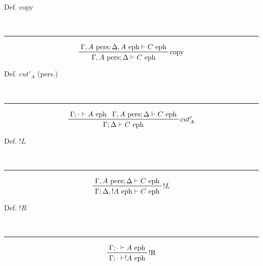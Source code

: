 \begin{note}
  \begin{field}
    Def. copy
  \end{field} \\
  \noindent\rule[0.5ex]{\linewidth}{1pt}
  \begin{field}
    \[ 
      \prftree[r]
      {copy}
      {\Gamma,A\text{ pers};\Delta,A\text{ eph}\vdash C\text{ eph}}
      {\Gamma,A\text{ pers};\Delta\vdash C\text{ eph}}
    \] 
  \end{field}
\end{note}


\begin{note}
  \begin{field}
    Def. $cut'_A$ (pers.)
  \end{field} \\
  \noindent\rule[0.5ex]{\linewidth}{1pt}
  \begin{field}
    \[ 
      \prftree[r]
      {$cut'_A$}
      {\Gamma;\cdot\vdash A\text{ eph}}
      {\Gamma,A\text{ pers};\Delta\vdash C\text{ eph}}
      {\Gamma;\Delta\vdash C\text{ eph}}
    \] 
  \end{field}
\end{note}


\begin{note}
  \begin{field}
    Def. $!L$
  \end{field} \\
  \noindent\rule[0.5ex]{\linewidth}{1pt}
  \begin{field}
    \[ 
      \prftree[r]
      {$!L$}
      {\Gamma, A\text{ pers}; \Delta\vdash C\text{ eph} }
      {\Gamma; \Delta, !A\text{ eph}\vdash C\text{ eph}}
    \] 
  \end{field}
\end{note}

\begin{note}
  \begin{field}
    Def. $!R$
  \end{field} \\
  \noindent\rule[0.5ex]{\linewidth}{1pt}
  \begin{field}
    \[ 
      \prftree[r]
      {!R}
      {\Gamma; \cdot\vdash A\text{ eph}}
      {\Gamma; \cdot\vdash !A\text{ eph}}
    \] 
  \end{field}
\end{note}













